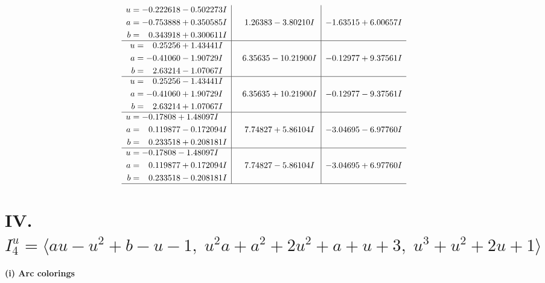 \documentclass[1p]{elsarticle_modified}
\theoremstyle{definition}
\begin{document}
$$\begin{array}{c|c|c}
\begin{aligned}
u &= -0.222618 - 0.502273 I \\
a &= -0.753888 + 0.350585 I \\
b &= \phantom{-}0.343918 + 0.300611 I\end{aligned}
 & \phantom{-}1.26383 - 3.80210 I & -1.63515 + 6.00657 I \\ \hline\begin{aligned}
u &= \phantom{-}0.25256 + 1.43441 I \\
a &= -0.41060 - 1.90729 I \\
b &= \phantom{-}2.63214 - 1.07067 I\end{aligned}
 & \phantom{-}6.35635 - 10.21900 I & -0.12977 + 9.37561 I \\ \hline\begin{aligned}
u &= \phantom{-}0.25256 - 1.43441 I \\
a &= -0.41060 + 1.90729 I \\
b &= \phantom{-}2.63214 + 1.07067 I\end{aligned}
 & \phantom{-}6.35635 + 10.21900 I & -0.12977 - 9.37561 I \\ \hline\begin{aligned}
u &= -0.17808 + 1.48097 I \\
a &= \phantom{-}0.119877 - 0.172094 I \\
b &= \phantom{-}0.233518 + 0.208181 I\end{aligned}
 & \phantom{-}7.74827 + 5.86104 I & -3.04695 - 6.97760 I \\ \hline\begin{aligned}
u &= -0.17808 - 1.48097 I \\
a &= \phantom{-}0.119877 + 0.172094 I \\
b &= \phantom{-}0.233518 - 0.208181 I\end{aligned}
 & \phantom{-}7.74827 - 5.86104 I & -3.04695 + 6.97760 I\\
 \hline 
 \end{array}$$\newpage\newpage\renewcommand{\arraystretch}{1}
\centering \section*{IV. $I^u_{4}= \langle a u- u^2+b- u-1,\;u^2 a+a^2+2 u^2+a+u+3,\;u^3+u^2+2 u+1 \rangle$}
\flushleft \textbf{(i) Arc colorings}\\
\end{document}
